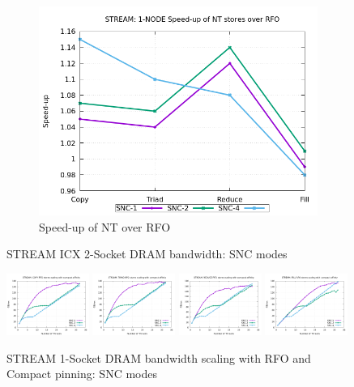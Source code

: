 \documentclass{article}
\begin{document}
\begin{figure}[!hb]
\begin{subfigure}[!hb]{0.3\textwidth}
         \centering
         \includegraphics[width=\textwidth]{../data/icx-32c-snc/mem_bw_node/mb_node_nt_rfo}
         \caption{Speed-up of NT over RFO}
         \label{figure:mem_bw_node_nt_rfo_icx_snc}
    \end{subfigure}

    \caption{STREAM ICX 2-Socket DRAM bandwidth: SNC modes}
    \label{figure:mem_bw_node_icx_snc}
\end{figure}


\begin{figure}[!hb]
    \centering
    \includegraphics[width=0.24\textwidth]{../data/icx-32c-snc/mem_bw_scale/mb_scale_compact_Copy_rfo}
    \includegraphics[width=0.24\textwidth]{../data/icx-32c-snc/mem_bw_scale/mb_scale_compact_Triad_rfo}
    \includegraphics[width=0.24\textwidth]{../data/icx-32c-snc/mem_bw_scale/mb_scale_compact_Reduce_rfo}
    \includegraphics[width=0.24\textwidth]{../data/icx-32c-snc/mem_bw_scale/mb_scale_compact_Fill_rfo}
    \caption{STREAM 1-Socket DRAM bandwidth scaling with RFO and Compact pinning: SNC modes}
    \label{figure:mem_bw_scale_compact_rfo_icx_snc}
\end{figure}
\end{document}
